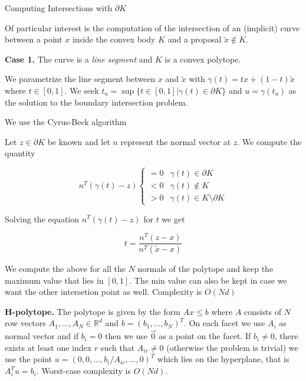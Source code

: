 \documentclass[10pt]{beamer}
\begin{document}
\begin{frame}[allowframebreaks]{Computing Intersections with $\partial K$}
    
    
    Of particular interest is the computation of the intersection of an (implicit) curve between a point $x$ inside the convex body $K$ and a proposal $\tilde x \not \in K$. 
    
    \medskip

    \textbf{Case 1.} The curve is a \emph{line segment} and $K$ is a convex polytope.

    We parametrize the line segment between $x$ and $\tilde x$ with $\gamma(t) = t x + (1 - t) \tilde x$ where $t \in [0, 1]$. We seek $t_u = \sup \{ t \in [0, 1] | \gamma(t) \in \partial K \}$ and $u = \gamma(t_u)$ as the solution to the boundary intersection problem. 
    
    \medskip
    
    We use the Cyrus-Beck  \cite{cyrus1978generalized} algorithm
    
    \framebreak
    
    Let $z \in \partial K$ be known and let $n$ represent the normal vector at $z$. We compute the quantity 
    
    \begin{equation*}
        n^T (\gamma(t) - z) \begin{cases} = 0 & \gamma(t) \in \partial K \\
        < 0 & \gamma(t) \notin K \\
        > 0 & \gamma(t) \in K \setminus \partial K
        \end{cases}
    \end{equation*}

    Solving the equation $n^T (\gamma(t) - z)$ for $t$ we get 
    
    $$t = \frac {n^T (z - x)} {n^T (\tilde x - x)}$$

    We compute the above for all the $N$ normals of the polytope and keep the maximum value that lies in $[0, 1]$. The min value can also be kept in case we want the other intersetion point as well. Complexity is $O(Nd)$
    
    \framebreak
    
    \textbf{H-polytope.} The polytope is given by the form $Ax \le b$ where $A$ consists of $N$ row vectors $A_1, \dots, A_N \in \mathbb R^d$ and $b = (b_1, \dots, b_N)^T$. On each facet we use $A_i$ as normal vector and if $b_i = 0$ then we use $\vec 0$ as a point on the facet. If $b_i \neq 0$, there exists at least one index $r$ such that $A_{ir} \neq 0$ (otherwise the problem is trivial) we use the point $u = (0, 0, \dots, b_i / A_{ir}, \dots, 0)^T$ which lies on the hyperplane, that is $A_i^T u = b_i$. Worst-case complexity is $O(Nd)$. 
    

\end{frame}
\end{document}
